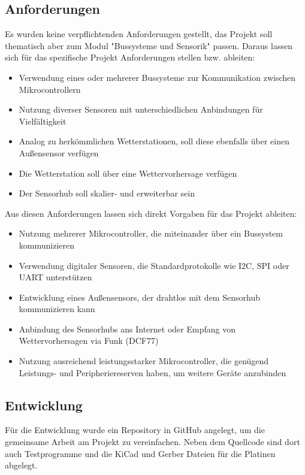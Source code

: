 \documentclass[a4paper,11pt]{article}
\begin{document}
\subsection{Anforderungen}
\label{subsub:anforderungen}

Es wurden keine verpflichtenden Anforderungen gestellt, das Projekt soll thematisch aber zum Modul
"Bussysteme und Sensorik" passen. Daraus lassen sich für das spezifische Projekt Anforderungen stellen bzw. ableiten:

\begin{itemize}
  \item Verwendung eines oder mehrerer Bussysteme zur Kommunikation zwischen Mikrocontrollern
  \item Nutzung diverser Sensoren mit unterschiedlichen Anbindungen für Vielfältigkeit
  \item Analog zu herkömmlichen Wetterstationen, soll diese ebenfalls über einen Außensensor verfügen
  \item Die Wetterstation soll über eine Wettervorhersage verfügen
  \item Der Sensorhub soll skalier- und erweiterbar sein
\end{itemize}

\noindent
Aus diesen Anforderungen lassen sich direkt Vorgaben für das Projekt ableiten:
\begin{itemize}
  \item Nutzung mehrerer Mikrocontroller, die miteinander über ein Bussystem kommunizieren
  \item Verwendung digitaler Sensoren, die Standardprotokolle wie I2C, SPI oder UART unterstützen
  \item Entwicklung eines Außensensors, der drahtlos mit dem Sensorhub kommunizieren kann
  \item Anbindung des Sensorhubs ans Internet oder Empfang von Wettervorhersagen via Funk (DCF77)
  \item Nutzung ausreichend leistungsstarker Mikrocontroller, die genügend Leistungs- und Peripheriereserven haben, um weitere Geräte anzubinden
\end{itemize}

\subsection{Entwicklung}

Für die Entwicklung wurde ein Repository in GitHub angelegt, um die gemeinsame Arbeit am Projekt zu vereinfachen. Neben dem Quellcode sind dort auch Testprogramme
und die KiCad und Gerber Dateien für die Platinen abgelegt. 
\end{document}
